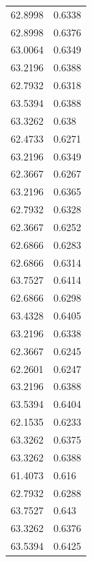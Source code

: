 \begin{longtable}{@{}ll@{}}
	62.8998  & 0.6338  \\
	62.8998  & 0.6376  \\
	63.0064  & 0.6349  \\
	63.2196  & 0.6388  \\
	62.7932  & 0.6318  \\
	63.5394  & 0.6388  \\
	63.3262  & 0.638   \\
	62.4733  & 0.6271  \\
	63.2196  & 0.6349  \\
	62.3667  & 0.6267  \\
	63.2196  & 0.6365  \\
	62.7932  & 0.6328  \\
	62.3667  & 0.6252  \\
	62.6866  & 0.6283  \\
	62.6866  & 0.6314  \\
	63.7527  & 0.6414  \\
	62.6866  & 0.6298  \\
	63.4328  & 0.6405  \\
	63.2196  & 0.6338  \\
	62.3667  & 0.6245  \\
	62.2601  & 0.6247  \\
	63.2196  & 0.6388  \\
	63.5394  & 0.6404  \\
	62.1535  & 0.6233  \\
	63.3262  & 0.6375  \\
	63.3262  & 0.6388  \\
	61.4073  & 0.616   \\
	62.7932  & 0.6288  \\
	63.7527  & 0.643   \\
	63.3262  & 0.6376  \\
	63.5394  & 0.6425  \\ \bottomrule
\end{longtable}

